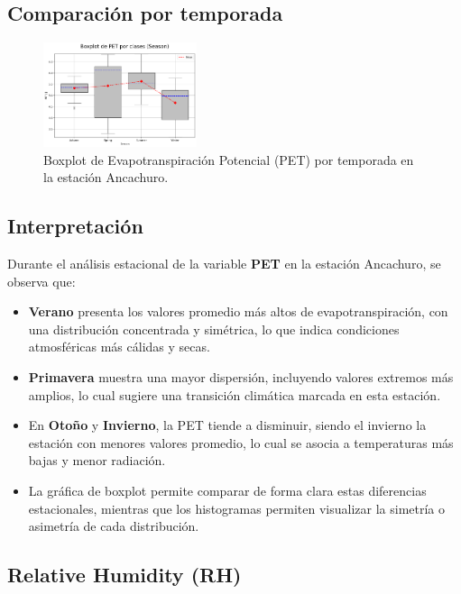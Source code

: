 \subsection*{Comparación por temporada}

\begin{figure}[H]
\centering
\includegraphics[width=0.4\textwidth]{resultados/por_estacion_del_anio/Ancachuro/PET_ClassBoxplot_Season.png}
\caption{Boxplot de Evapotranspiración Potencial (PET) por temporada en la estación Ancachuro.}
\label{fig:pet_box_ancachuro}
\end{figure}

\subsection*{Interpretación}

Durante el análisis estacional de la variable \textbf{PET} en la estación Ancachuro, se observa que:

\begin{itemize}
    \item \textbf{Verano} presenta los valores promedio más altos de evapotranspiración, con una distribución concentrada y simétrica, lo que indica condiciones atmosféricas más cálidas y secas.
    \item \textbf{Primavera} muestra una mayor dispersión, incluyendo valores extremos más amplios, lo cual sugiere una transición climática marcada en esta estación.
    \item En \textbf{Otoño} y \textbf{Invierno}, la PET tiende a disminuir, siendo el invierno la estación con menores valores promedio, lo cual se asocia a temperaturas más bajas y menor radiación.
    \item La gráfica de boxplot permite comparar de forma clara estas diferencias estacionales, mientras que los histogramas permiten visualizar la simetría o asimetría de cada distribución.
\end{itemize}


\subsection{Relative Humidity (RH)}

